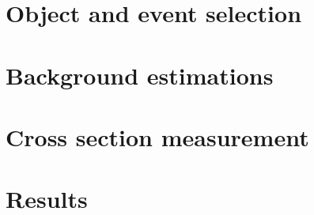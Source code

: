 \section{Object and event selection}\label{ssww13tev:object_event_selection}


%

\section{Background estimations}\label{ssww13tev:background}


\section{Cross section measurement}\label{ssww13tev:xsec}


\section{Results}\label{ssww13tev:results}

